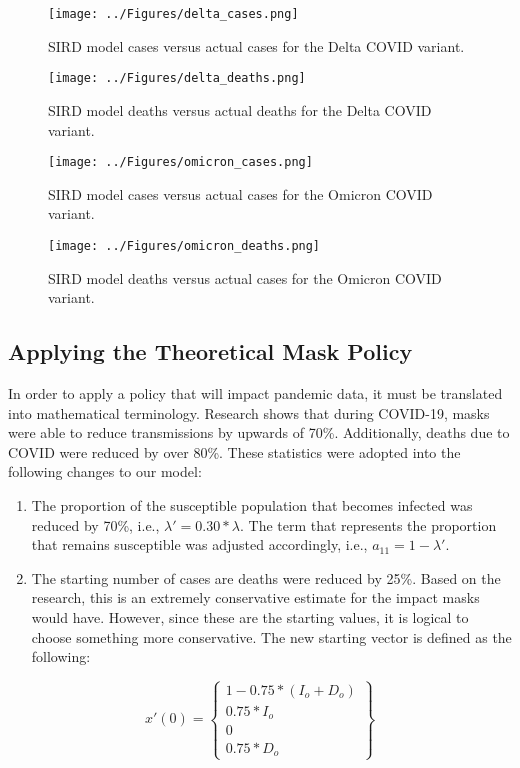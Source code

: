 \documentclass[conference]{IEEEtran}
\begin{document}
\begin{figure}[htbp]
  \centerline{\texttt{[image: ../Figures/delta\_cases.png]}}
  \caption{SIRD model cases versus actual cases for the Delta COVID variant.}
  \label{fig:sird_model_inf_delta}
\end{figure}  

\begin{figure}[htbp]
  \centerline{\texttt{[image: ../Figures/delta\_deaths.png]}}
  \caption{SIRD model deaths versus actual deaths for the Delta COVID variant.}
  \label{fig:sird_model_det_delta}
\end{figure}  

\begin{figure}[htbp]
  \centerline{\texttt{[image: ../Figures/omicron\_cases.png]}}
  \caption{SIRD model cases versus actual cases for the Omicron COVID variant.}
  \label{fig:sird_model_inf_om}
\end{figure}  

\begin{figure}[htbp]
  \centerline{\texttt{[image: ../Figures/omicron\_deaths.png]}}
  \caption{SIRD model deaths versus actual cases for the Omicron COVID variant.}
  \label{fig:sird_model_det_om}
\end{figure}  


\subsection{Applying the Theoretical Mask Policy}
In order to apply a policy that will impact pandemic data, it must be translated into mathematical terminology. Research shows that during COVID-19, masks were able to reduce transmissions by upwards of 70\%. Additionally, deaths due to COVID were reduced by over 80\%. These statistics were adopted into the following changes to our model:
\begin{enumerate}
\item The proportion of the susceptible population that becomes infected was reduced by 70\%, i.e., $\lambda' = 0.30 * \lambda$. The term that represents the proportion that remains susceptible was adjusted accordingly, i.e., $a_{11} = 1 - \lambda'$.
\item The starting number of cases are deaths were reduced by 25\%. Based on the research, this is an extremely conservative estimate for the impact masks would have. However, since these are the starting values, it is logical to choose something more conservative. The new starting vector is defined as the following:
\end{enumerate}
\begin{equation}
x'(0) = \begin{Bmatrix}
1 - 0.75 * (I_o + D_o) \\
0.75 * I_o \\
0 \\
0.75 * D_o
\end{Bmatrix}
\end{equation}
\end{document}
